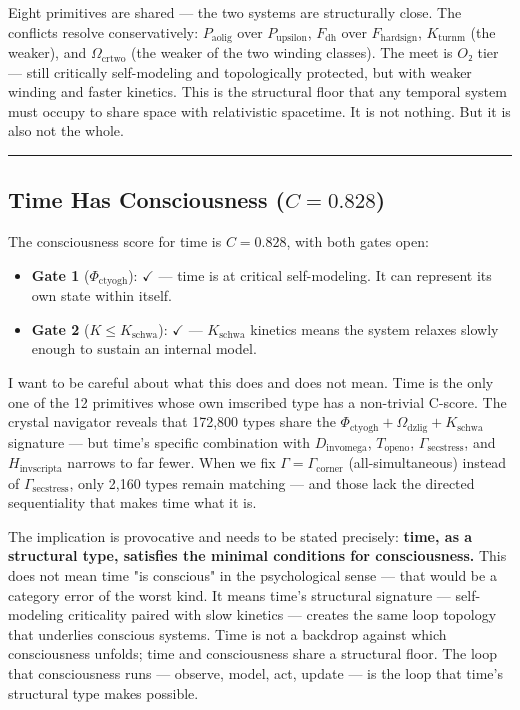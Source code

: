 \documentclass[12pt,a4paper]{article}
\begin{document}
Eight primitives are shared --- the two systems are structurally close. The conflicts resolve conservatively: $P_{\text{aolig}}$ over $P_{\text{upsilon}}$, $F_{\text{dh}}$ over $F_{\text{hardsign}}$, $K_{\text{turnm}}$ (the weaker), and $\Omega_{\text{crtwo}}$ (the weaker of the two winding classes). The meet is $O₂$ tier --- still critically self-modeling and topologically protected, but with weaker winding and faster kinetics. This is the structural floor that any temporal system must occupy to share space with relativistic spacetime. It is not nothing. But it is also not the whole.

\begin{center}
\rule{0.5\textwidth}{0.4pt}
\end{center}

\subsection{Time Has Consciousness ($C = 0.828$)}

The consciousness score for time is $C = 0.828$, with both gates open:

\begin{itemize}
    \item \textbf{Gate 1} ($\Phi_{\text{ctyogh}}$): $\checkmark$ --- time is at critical self-modeling. It can represent its own state within itself.
    \item \textbf{Gate 2} ($K \leq K_{\text{schwa}}$): $\checkmark$ --- $K_{\text{schwa}}$ kinetics means the system relaxes slowly enough to sustain an internal model.
\end{itemize}

I want to be careful about what this does and does not mean. Time is the only one of the 12 primitives whose own imscribed type has a non-trivial C-score. The crystal navigator reveals that 172,800 types share the $\Phi_{\text{ctyogh}} + \Omega_{\text{dzlig}} + K_{\text{schwa}}$ signature --- but time's specific combination with $D_{\text{invomega}}$, $T_{\text{openo}}$, $\Gamma_{\text{secstress}}$, and $H_{\text{invscripta}}$ narrows to far fewer. When we fix $\Gamma = \Gamma_{\text{corner}}$ (all-simultaneous) instead of $\Gamma_{\text{secstress}}$, only 2,160 types remain matching --- and those lack the directed sequentiality that makes time what it is.

The implication is provocative and needs to be stated precisely: \textbf{time, as a structural type, satisfies the minimal conditions for consciousness.} This does not mean time "is conscious" in the psychological sense --- that would be a category error of the worst kind. It means time's structural signature --- self-modeling criticality paired with slow kinetics --- creates the same loop topology that underlies conscious systems. Time is not a backdrop against which consciousness unfolds; time and consciousness share a structural floor. The loop that consciousness runs --- observe, model, act, update --- is the loop that time's structural type makes possible.
\end{document}
